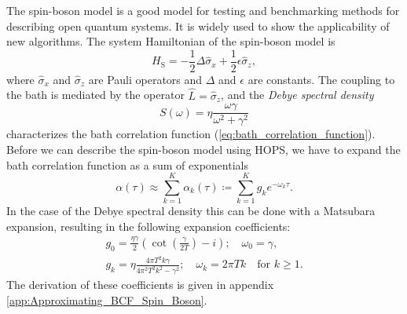 The spin-boson model is a good model for testing and benchmarking methods for describing open quantum systems. It is widely used
to show the applicability of new algorithms. The system Hamiltonian of the spin-boson model is
\begin{equation}
    \label{eq:system_hamiltonian_SBM}
    H_\text{S} = -\frac{1}{2}\Delta\hat{\sigma}_x + \frac{1}{2}\epsilon\hat{\sigma}_z,
\end{equation}
where $\hat{\sigma}_x$ and $\hat{\sigma}_z$ are Pauli operators and $\Delta$ and $\epsilon$ are constants.
The coupling to the bath is mediated by the operator $\hat{L} = \hat{\sigma}_z$, and the \textit{Debye spectral density}
\begin{equation*}
    S(\omega) =\eta\frac{\omega\gamma}{\omega^2+\gamma^2}
\end{equation*}
characterizes the bath correlation function (\ref{eq:bath_correlation_function}). Before we can describe the spin-boson
model using HOPS, we have to expand the bath correlation function as a sum of exponentials
\begin{equation*}
    \alpha\left(\tau\right) \approx \sum_{k=1}^{K} \alpha_k\left(\tau\right) \coloneqq \sum_{k=1}^{K} g_k e^{-\omega_k\tau}.
\end{equation*}
In the case of the Debye spectral density this can be done with a Matsubara expansion, resulting in the following expansion coefficients:
\begin{equation}
    \begin{split}
        \label{eq:expansion_coefficients_debye_BCF_SBM}
        g_0 = \frac{\eta\gamma}{2}\left(
            \cot\left(\frac{\gamma}{2T}\right) - i
        \right);\quad
        \omega_0 = \gamma,\\
        g_k = \eta \frac{4\pi T^2k\gamma}{4\pi^2T^2k^2-\gamma^2};\quad
        \omega_k = 2\pi Tk \quad \text{for }k\ge1.
    \end{split}
\end{equation}
The derivation of these coefficients is given in appendix \ref{app:Approximating_BCF_Spin_Boson}.
